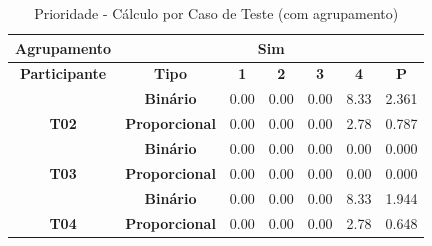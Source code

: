 \begin{table}[htbp]
	\centering
	\caption{Prioridade - Cálculo por Caso de Teste (com agrupamento)}
	\begin{tabular}{|c|cccccc|}
		\hline
		\cellcolor[HTML]{F2F2F2}\textbf{Agrupamento} &
		\multicolumn{6}{c|}{Sim} \\ \hline
		\rowcolor[HTML]{D0CECE} 
		\textbf{Participante} &
		\multicolumn{1}{c|}{\cellcolor[HTML]{D0CECE}\textbf{Tipo}} &
		\multicolumn{1}{c|}{\cellcolor[HTML]{D0CECE}\textbf{1}} &
		\multicolumn{1}{c|}{\cellcolor[HTML]{D0CECE}\textbf{2}} &
		\multicolumn{1}{c|}{\cellcolor[HTML]{D0CECE}\textbf{3}} &
		\multicolumn{1}{c|}{\cellcolor[HTML]{D0CECE}\textbf{4}} &
		\textbf{P} \\ \hline
		&
		\multicolumn{1}{c|}{\textbf{Binário}} &
		\multicolumn{1}{c|}{0.00} &
		\multicolumn{1}{c|}{0.00} &
		\multicolumn{1}{c|}{0.00} &
		\multicolumn{1}{c|}{8.33} &
		2.361 \\ \cline{2-7} 
		\multirow{-2}{*}{\textbf{T02}} &
		\multicolumn{1}{l|}{\cellcolor[HTML]{F2F2F2}\textbf{Proporcional}} &
		\multicolumn{1}{c|}{\cellcolor[HTML]{F2F2F2}0.00} &
		\multicolumn{1}{c|}{\cellcolor[HTML]{F2F2F2}0.00} &
		\multicolumn{1}{c|}{\cellcolor[HTML]{F2F2F2}0.00} &
		\multicolumn{1}{c|}{\cellcolor[HTML]{F2F2F2}2.78} &
		\cellcolor[HTML]{F2F2F2}0.787 \\ \hline
		&
		\multicolumn{1}{c|}{\textbf{Binário}} &
		\multicolumn{1}{c|}{0.00} &
		\multicolumn{1}{c|}{0.00} &
		\multicolumn{1}{c|}{0.00} &
		\multicolumn{1}{c|}{0.00} &
		0.000 \\ \cline{2-7} 
		\multirow{-2}{*}{\textbf{T03}} &
		\multicolumn{1}{l|}{\cellcolor[HTML]{F2F2F2}\textbf{Proporcional}} &
		\multicolumn{1}{c|}{\cellcolor[HTML]{F2F2F2}0.00} &
		\multicolumn{1}{c|}{\cellcolor[HTML]{F2F2F2}0.00} &
		\multicolumn{1}{c|}{\cellcolor[HTML]{F2F2F2}0.00} &
		\multicolumn{1}{c|}{\cellcolor[HTML]{F2F2F2}0.00} &
		\cellcolor[HTML]{F2F2F2}0.000 \\ \hline
		&
		\multicolumn{1}{c|}{\textbf{Binário}} &
		\multicolumn{1}{c|}{0.00} &
		\multicolumn{1}{c|}{0.00} &
		\multicolumn{1}{c|}{0.00} &
		\multicolumn{1}{c|}{8.33} &
		1.944 \\ \cline{2-7} 
		\multirow{-2}{*}{\textbf{T04}} &
		\multicolumn{1}{l|}{\cellcolor[HTML]{F2F2F2}\textbf{Proporcional}} &
		\multicolumn{1}{c|}{\cellcolor[HTML]{F2F2F2}0.00} &
		\multicolumn{1}{c|}{\cellcolor[HTML]{F2F2F2}0.00} &
		\multicolumn{1}{c|}{\cellcolor[HTML]{F2F2F2}0.00} &
		\multicolumn{1}{c|}{\cellcolor[HTML]{F2F2F2}2.78} &
		\cellcolor[HTML]{F2F2F2}0.648 \\ \hline

\end{tabular}
\end{table}
